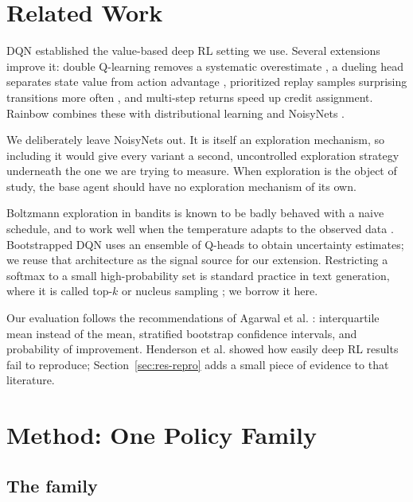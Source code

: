 \documentclass[11pt,a4paper]{article}
\begin{document}
\section{Related Work}
\label{sec:related}

DQN \cite{mnih2015} established the value-based deep RL setting we use. Several
extensions improve it: double Q-learning removes a systematic overestimate
\cite{vanhasselt2016}, a dueling head separates state value from action
advantage \cite{wang2016}, prioritized replay samples surprising transitions
more often \cite{schaul2016}, and multi-step returns speed up credit
assignment. Rainbow \cite{hessel2018} combines these with distributional
learning \cite{bellemare2017} and NoisyNets \cite{fortunato2018}.

We deliberately leave NoisyNets out. It is itself an exploration mechanism, so
including it would give every variant a second, uncontrolled exploration
strategy underneath the one we are trying to measure. When exploration is the
object of study, the base agent should have no exploration mechanism of its
own.

Boltzmann exploration in bandits is known to be badly behaved with a naive
schedule, and to work well when the temperature adapts to the observed data
\cite{cesabianchi2017}. Bootstrapped DQN \cite{osband2016} uses an ensemble of
Q-heads to obtain uncertainty estimates; we reuse that architecture as the
signal source for our extension. Restricting a softmax to a small
high-probability set is standard practice in text generation, where it is
called top-$k$ or nucleus sampling \cite{holtzman2020}; we borrow it here.

Our evaluation follows the recommendations of Agarwal et al.
\cite{agarwal2021}: interquartile mean instead of the mean, stratified
bootstrap confidence intervals, and probability of improvement. Henderson et
al. \cite{henderson2018} showed how easily deep RL results fail to reproduce;
Section~\ref{sec:res-repro} adds a small piece of evidence to that literature.

\section{Method: One Policy Family}
\label{sec:method}

\subsection{The family}
\end{document}
